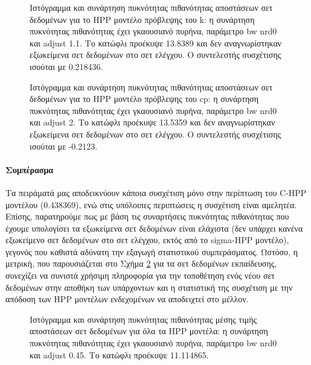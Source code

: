 \begin{figure}[!htb]
	\begin{minipage}{0.45\textwidth}
		\centering
		\scalebox{0.35}{
			}
		\caption[Ιστόγραμμα και συνάρτηση πυκνότητας πιθανότητας αποστάσεων σετ δεδομένων για το HPP μοντέλο πρόβλεψης του k]{Ιστόγραμμα και συνάρτηση πυκνότητας πιθανότητας αποστάσεων σετ δεδομένων για το HPP μοντέλο πρόβλεψης του k: η συνάρτηση πυκνότητας πιθανότητας έχει γκαουσιανό πυρήνα, παράμετρο bw nrd0 και adjust 1.1. Το κατώφλι προέκυψε 13.8389 και δεν αναγνωρίστηκαν εξωκείμενα σετ δεδομένων στο σετ ελέγχου. Ο συντελεστής συσχέτισης ισούται με 0.218436.}
		\label{fig:histk}
	\end{minipage} \hfill
	\begin{minipage}{0.45\textwidth}
		\centering
		\scalebox{0.35}{
			}
		\caption[Ιστόγραμμα και συνάρτηση πυκνότητας πιθανότητας αποστάσεων σετ δεδομένων για το HPP μοντέλο πρόβλεψης του cp]{Ιστόγραμμα και συνάρτηση πυκνότητας πιθανότητας αποστάσεων σετ δεδομένων για το HPP μοντέλο πρόβλεψης του cp: η συνάρτηση πυκνότητας πιθανότητας έχει γκαουσιανό πυρήνα, παράμετρο bw nrd0 και adjust 2. Το κατώφλι προέκυψε 13.5359 και δεν αναγνωρίστηκαν εξωκείμενα σετ δεδομένων στο σετ ελέγχου. Ο συντελεστής συσχέτισης ισούται με -0.2123.}
		\label{fig:histcp}
	\end{minipage}
\end{figure}

\paragraph{Συμπέρασμα} Τα πειράματά μας αποδεικνύουν κάποια συσχέτιση μόνο στην περίπτωση του C-HPP μοντέλου (0.438369), ενώ στις υπόλοιπες περιπτώσεις η συσχέτιση είναι αμελητέα. Επίσης, παρατηρούμε πως με βάση τις συναρτήσεις πυκνότητας πιθανότητας που έχουμε υπολογίσει τα εξωκείμενα σετ δεδομένων είναι ελάχιστα (δεν υπάρχει κανένα εξωκείμενο σετ δεδομένων στο σετ ελέγχου, εκτός από το sigma-HPP μοντέλο), γεγονός που καθιστά αδύνατη την εξαγωγή στατιστικού συμπεράσματος. Ωστόσο, η μετρική, που παρουσιάζεται στο Σχήμα \ref{fig:histtotal} για τα σετ δεδομένων εκπαίδευσης, συνεχίζει να συνιστά χρήσιμη πληροφορία για την τοποθέτηση ενός νέου σετ δεδομένων στην αποθήκη των υπάρχοντων και η στατιστική της συσχέτιση με την απόδοση των HPP μοντέλων ενδεχομένων να αποδειχτεί στο μέλλον.

\begin{figure}[htbp]
	\scalebox{0.7}{
		}
	\caption[Ιστόγραμμα και συνάρτηση πυκνότητας πιθανότητας μέσης τιμής αποστάσεων σετ δεδομένων για όλα τα HPP μοντέλα]{Ιστόγραμμα και συνάρτηση πυκνότητας πιθανότητας μέσης τιμής αποστάσεων σετ δεδομένων για όλα τα HPP μοντέλα: η συνάρτηση πυκνότητας πιθανότητας έχει γκαουσιανό πυρήνα, παράμετρο bw nrd0 και adjust 0.45. Το κατώφλι προέκυψε 11.114865.}
	\label{fig:histtotal}
\end{figure}

